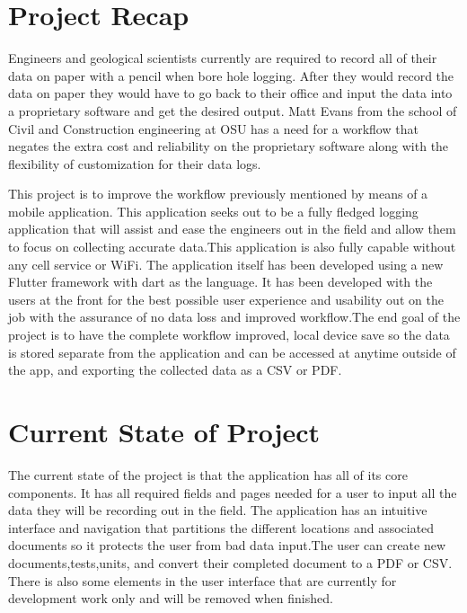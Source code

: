 \documentclass[onecolumn, draftclsnofoot,10pt, compsoc]{IEEEtran}
\begin{document}
\section{Project Recap}
Engineers and geological scientists currently are required to record all of their data on paper with a pencil when bore hole logging. After they would record the data on paper they would have to go back to their office and input the data into a proprietary software and get the desired output. Matt Evans from the school of Civil and Construction engineering at OSU has a need for a workflow that negates the extra cost and reliability on the proprietary software along with the flexibility of customization for their data logs.\par
This project is to improve the workflow previously mentioned by means of a mobile application. This application seeks out to be a fully fledged logging application that will assist and ease the engineers out in the field and allow them to focus on collecting accurate data.This application is also fully capable without any cell service or WiFi. The application itself has been developed using a new Flutter framework with dart as the language. It has been developed with the users at the front for the best possible user experience and usability out on the job with the assurance of no data loss and improved workflow.The end goal of the project is to have the complete workflow improved, local device save so the data is stored separate from the application and can be accessed at anytime outside of the app, and exporting the collected data as a CSV or PDF. 
\section{Current State of Project}
The current state of the project is that the application has all of its core components. It has all required fields and pages needed for a user to input all the data they will be recording out in the field. The application has an intuitive interface and navigation that partitions the different locations and associated documents so it protects the user from bad data input.The user can create new documents,tests,units, and convert their completed document to a PDF or CSV. There is also some elements in the user interface that are currently for development work only and will be removed when finished. 
\end{document}
